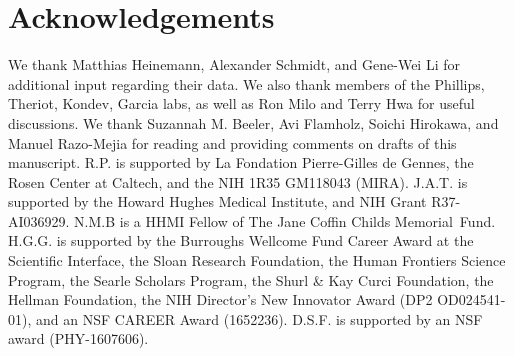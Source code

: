 \section{Acknowledgements}
We thank Matthias Heinemann, Alexander Schmidt, and Gene-Wei Li for additional
input regarding their data. We also thank members of the Phillips, Theriot,
Kondev, Garcia labs, as well as Ron Milo and Terry Hwa for useful discussions.
We thank Suzannah M. Beeler, Avi Flamholz, Soichi Hirokawa, and Manuel
Razo-Mejia for reading and providing comments on drafts of this manuscript. R.P.
is supported by La Fondation Pierre-Gilles de Gennes, the Rosen Center at
Caltech, and the NIH 1R35 GM118043 (MIRA). J.A.T. is supported by the Howard
Hughes Medical Institute, and NIH Grant R37-AI036929. N.M.B is a HHMI Fellow of
The Jane Coffin Childs Memorial Fund. H.G.G. is supported by the Burroughs
Wellcome Fund Career Award at the Scientific Interface, the Sloan Research
Foundation, the Human Frontiers Science Program, the Searle Scholars Program,
the Shurl \& Kay Curci Foundation, the Hellman Foundation, the NIH Director’s
New Innovator Award (DP2 OD024541-01), and an NSF CAREER Award (1652236). D.S.F.
is supported by an NSF award (PHY-1607606).
